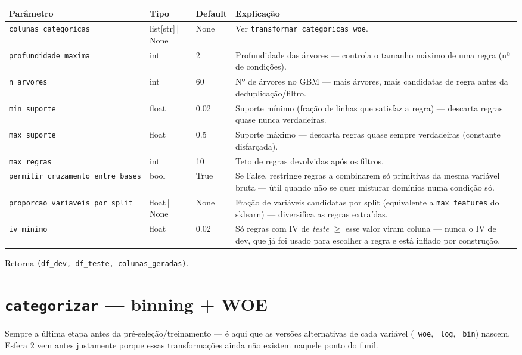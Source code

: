 \documentclass[11pt]{article}
\begin{document}
\begin{longtable}{P{4cm}P{2cm}P{1.6cm}P{6.5cm}}
\toprule
\textbf{Parâmetro} & \textbf{Tipo} & \textbf{Default} & \textbf{Explicação} \\
\midrule
\endhead
\texttt{colunas\_categoricas} & list[str]\,|\,None & None & Ver \texttt{transformar\_categoricas\_woe}. \\
\texttt{profundidade\_maxima} & int & 2 & Profundidade das árvores --- controla o tamanho máximo de uma regra (nº de condições). \\
\texttt{n\_arvores} & int & 60 & Nº de árvores no GBM --- mais árvores, mais candidatas de regra antes da deduplicação/filtro. \\
\texttt{min\_suporte} & float & 0.02 & Suporte mínimo (fração de linhas que satisfaz a regra) --- descarta regras quase nunca verdadeiras. \\
\texttt{max\_suporte} & float & 0.5 & Suporte máximo --- descarta regras quase sempre verdadeiras (constante disfarçada). \\
\texttt{max\_regras} & int & 10 & Teto de regras devolvidas após os filtros. \\
\texttt{permitir\_cruzamento\_entre\_bases} & bool & True & Se False, restringe regras a combinarem só primitivas da mesma variável bruta --- útil quando não se quer misturar domínios numa condição só. \\
\texttt{proporcao\_variaveis\_por\_split} & float\,|\,None & None & Fração de variáveis candidatas por split (equivalente a \texttt{max\_features} do sklearn) --- diversifica as regras extraídas. \\
\texttt{iv\_minimo} & float & 0.02 & Só regras com IV de \emph{teste} $\geq$ esse valor viram coluna --- nunca o IV de dev, que já foi usado para escolher a regra e está inflado por construção. \\
\bottomrule
\end{longtable}

Retorna \texttt{(df\_dev, df\_teste, colunas\_geradas)}.

\section{\texttt{categorizar} --- binning + WOE}

Sempre a última etapa antes da pré-seleção/treinamento --- é aqui que as
versões alternativas de cada variável (\texttt{\_woe}, \texttt{\_log},
\texttt{\_bin}) nascem. Esfera 2 vem antes justamente porque essas
transformações ainda não existem naquele ponto do funil.
\end{document}
